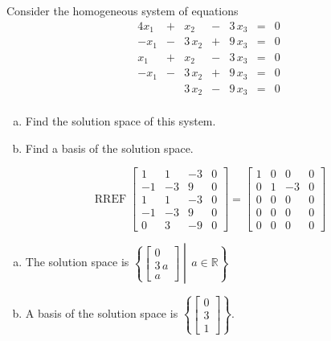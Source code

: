 
\begin{exerciseStatement}


Consider the homogeneous system of equations 
\begin{alignat*}{4} x_{1} &+& x_{2} &-& 3 \, x_{3} &=& 0 \\-x_{1} &-& 3 \, x_{2} &+& 9 \, x_{3} &=& 0 \\x_{1} &+& x_{2} &-& 3 \, x_{3} &=& 0 \\-x_{1} &-& 3 \, x_{2} &+& 9 \, x_{3} &=& 0 \\ & & 3 \, x_{2} &-& 9 \, x_{3} &=& 0 \\ \end{alignat*}
            


\begin{enumerate}[(a)]
\item  Find the solution space of this system.
\item  Find a basis of the solution space.
\end{enumerate}
    
\end{exerciseStatement}
    
\begin{exerciseAnswer} 


\[\operatorname{RREF} \left[\begin{array}{ccc|c}
1 & 1 & -3 & 0 \\
-1 & -3 & 9 & 0 \\
1 & 1 & -3 & 0 \\
-1 & -3 & 9 & 0 \\
0 & 3 & -9 & 0
\end{array}\right] = \left[\begin{array}{ccc|c}
1 & 0 & 0 & 0 \\
0 & 1 & -3 & 0 \\
0 & 0 & 0 & 0 \\
0 & 0 & 0 & 0 \\
0 & 0 & 0 & 0
\end{array}\right] \]


\begin{enumerate}[(a)]
\item The solution space is \( \left\{ \left[\begin{array}{c}
0 \\
3 \, a \\
a
\end{array}\right] \middle|\,a\in\mathbb{R}\right\} \)
\item A basis of the solution space is \( \left\{ \left[\begin{array}{c}
0 \\
3 \\
1
\end{array}\right] \right\} \).
\end{enumerate}
    
\end{exerciseAnswer}
    
